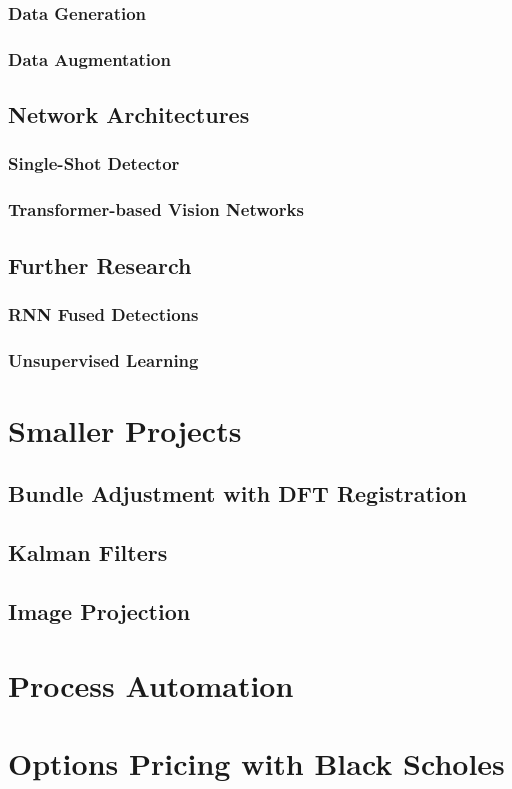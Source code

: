 \documentclass[12pt]{book}
\begin{document}
\subsection{Data Generation}

\subsection{Data Augmentation}

\section{Network Architectures}
\subsection{Single-Shot Detector}

\subsection{Transformer-based Vision Networks}

\section{Further Research}
\subsection{RNN Fused Detections}

\subsection{Unsupervised Learning}

\chapter{Smaller Projects}
\section{Bundle Adjustment with DFT Registration}

\section{Kalman Filters}

\section{Image Projection}

\chapter{Process Automation}

\chapter{Options Pricing with Black Scholes}



\end{document}
